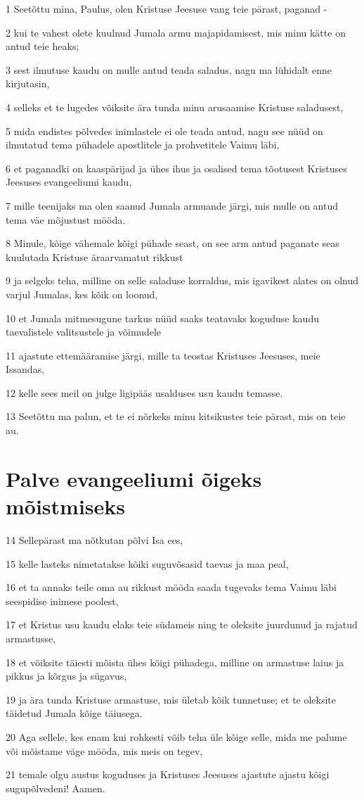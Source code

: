 \par 1 Seetõttu mina, Paulus, olen Kristuse Jeesuse vang teie pärast, paganad -
\par 2 kui te vahest olete kuulnud Jumala armu majapidamisest, mis minu kätte on antud teie heaks;
\par 3 sest ilmutuse kaudu on mulle antud teada saladus, nagu ma lühidalt enne kirjutasin,
\par 4 selleks et te lugedes võiksite ära tunda minu arusaamise Kristuse saladusest,
\par 5 mida endistes põlvedes inimlastele ei ole teada antud, nagu see nüüd on ilmutatud tema pühadele apostlitele ja prohvetitele Vaimu läbi,
\par 6 et paganadki on kaaspärijad ja ühes ihus ja osalised tema tõotusest Kristuses Jeesuses evangeeliumi kaudu,
\par 7 mille teenijaks ma olen saanud Jumala armuande järgi, mis mulle on antud tema väe mõjustust mööda.
\par 8 Minule, kõige vähemale kõigi pühade seast, on see arm antud paganate seas kuulutada Kristuse äraarvamatut rikkust
\par 9 ja selgeks teha, milline on selle saladuse korraldus, mis igavikest alates on olnud varjul Jumalas, kes kõik on loonud,
\par 10 et Jumala mitmesugune tarkus nüüd saaks teatavaks koguduse kaudu taevalistele valitsustele ja võimudele
\par 11 ajastute ettemääramise järgi, mille ta teostas Kristuses Jeesuses, meie Issandas,
\par 12 kelle sees meil on julge ligipääs usalduses usu kaudu temasse.
\par 13 Seetõttu ma palun, et te ei nõrkeks minu kitsikustes teie pärast, mis on teie au.

\section*{Palve evangeeliumi õigeks mõistmiseks}

\par 14 Sellepärast ma nõtkutan põlvi Isa ees,
\par 15 kelle lasteks nimetatakse kõiki suguvõsasid taevas ja maa peal,
\par 16 et ta annaks teile oma au rikkust mööda saada tugevaks tema Vaimu läbi seespidise inimese poolest,
\par 17 et Kristus usu kaudu elaks teie südameis ning te oleksite juurdunud ja rajatud armastusse,
\par 18 et võiksite täiesti mõista ühes kõigi pühadega, milline on armastuse laius ja pikkus ja kõrgus ja sügavus,
\par 19 ja ära tunda Kristuse armastuse, mis ületab kõik tunnetuse; et te oleksite täidetud Jumala kõige täiusega.
\par 20 Aga sellele, kes enam kui rohkesti võib teha üle kõige selle, mida me palume või mõistame väge mööda, mis meis on tegev,
\par 21 temale olgu austus koguduses ja Kristuses Jeesuses ajastute ajastu kõigi sugupõlvedeni! Aamen.


